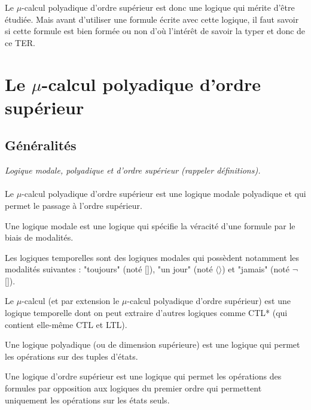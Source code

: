 \documentclass[11pt,a4paper]{article}
\begin{document}
Le $\mu$-calcul polyadique d'ordre supérieur est donc une logique qui mérite d'être étudiée. Mais avant d'utiliser une formule écrite avec cette logique, il faut savoir si cette formule est bien formée ou non d'où l'intérêt de savoir la typer et donc de ce TER. 

\section{Le $\mu$-calcul polyadique d'ordre supérieur}

\subsection{Généralités}

\textit{Logique modale, polyadique et d'ordre supérieur (rappeler définitions).}
\\\\

Le $\mu$-calcul polyadique d'ordre supérieur est une logique modale polyadique et qui permet le passage à l'ordre supérieur. 

\begin{dfn} Une logique modale est une logique qui spécifie la véracité d'une formule par le biais de modalités.
\end{dfn}

\begin{rema} Les logiques temporelles sont des logiques modales qui possèdent notamment les modalités suivantes : "toujours" (noté []), "un jour" (noté $\langle\rangle$) et "jamais" (noté $\neg$[]).
\end{rema}

Le $\mu$-calcul (et par extension le $\mu$-calcul polyadique d'ordre supérieur) est une logique temporelle dont on peut extraire d'autres logiques comme CTL* (qui contient elle-même CTL et LTL). 
 
\begin{dfn} Une logique polyadique (ou de dimension supérieure) est une logique qui permet les opérations sur des tuples d'états.
\end{dfn}

\begin{dfn} Une logique d'ordre supérieur est une logique qui permet les opérations des formules par opposition aux logiques du premier ordre qui permettent uniquement les opérations sur les états seuls.
\end{dfn}
\end{document}
